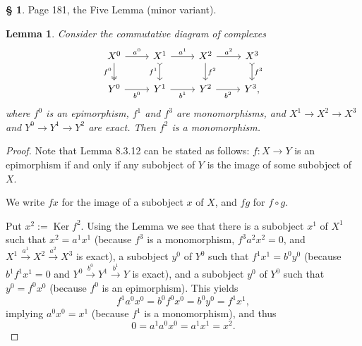 \documentclass[12pt]{article}
\newtheorem{lem}[thm]{Lemma}
\theoremstyle{remark}
\theoremstyle{definition}
\newtheorem{s}[thm]{\S}
\newcommand{\mv}{ (minor variant)}
\DeclareMathOperator{\Ker}{Ker}
\begin{document}
%
%
\begin{s} 
Page 181, the Five Lemma\mv. 
%
\begin{lem} 
Consider the commutative diagram of complexes 
$$
\begin{tikzcd}
X^0\arrow[two heads]{d}[swap]{f^0}\arrow{r}{a^0}&
X^1\arrow[tail]{d}[swap]{f^1}\arrow{r}{a^1}&
X^2\arrow{d}{f^2}\arrow{r}{a^2}&
X^3\arrow[tail]{d}{f^3}\\ 
Y^0\arrow{r}[swap]{b^0}&
Y^1\arrow{r}[swap]{b^1}&
Y^2\arrow{r}[swap]{b^2}&
Y^3,
\end{tikzcd}
$$
where $f^0$ is an epimorphism, $f^1$ and $f^3$ are monomorphisms, and $X^1\to X^2\to X^3$ and $Y^0\to Y^1\to Y^2$ are exact. Then $f^2$ is a monomorphism. 
\end{lem} 
%
\begin{proof}
Note that Lemma 8.3.12 can be stated as follows: $f:X\to Y$ is an epimorphism if and only if any subobject of $Y$ is the image of some subobject of $X$. 

We write $fx$ for the image of a subobject $x$ of $X$, and $fg$ for $f\circ g$.

Put $x^2:=\Ker f^2$. Using the Lemma we see that there is a subobject $x^1$ of $X^1$ such that $x^2=a^1x^1$ (because $f^3$ is a monomorphism, $f^3a^2x^2=0$, and $X^1\overset{a^1}{\to}X^2\overset{a^2}{\to}X^3$ is exact), a subobject $y^0$ of $Y^0$ such that $f^1x^1=b^0y^0$ (because $b^1f^1x^1=0$ and $Y^0\overset{b^0}{\to}Y^1\overset{b^1}{\to}Y$ is exact), and a subobject $y^0$ of $Y^0$ such that $y^0=f^0x^0$ (because $f^0$ is an epimorphism). This yields 
$$
f^1a^0x^0=b^0f^0x^0=b^0y^0=f^1x^1,
$$
implying $a^0x^0=x^1$ (because $f^1$ is a monomorphism), and thus 
$$
0=a^1a^0x^0=a^1x^1=x^2.
$$
\end{proof}
\end{s}
%
%
\end{document}
